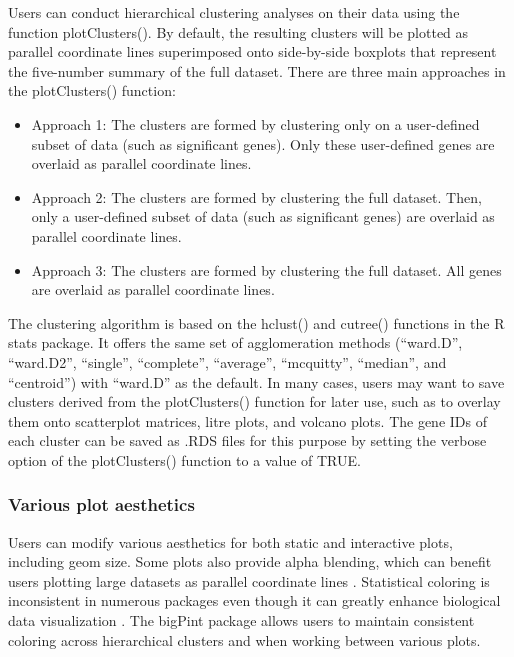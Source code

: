 \documentclass[parskip=full]{bmcart} %
\begin{document}
Users can conduct hierarchical clustering analyses on their data using the function plotClusters(). By default, the resulting clusters will be plotted as parallel coordinate lines superimposed onto side-by-side boxplots that represent the five-number summary of the full dataset. There are three main approaches in the plotClusters() function:

\begin{itemize}  
\item Approach 1: The clusters are formed by clustering only on a user-defined subset of data (such as significant genes). Only these user-defined genes are overlaid as parallel coordinate lines. 
\item Approach 2: The clusters are formed by clustering the full dataset. Then, only a user-defined subset of data (such as significant genes) are overlaid as parallel coordinate lines.
\item Approach 3: The clusters are formed by clustering the full dataset. All genes are overlaid as parallel coordinate lines.
\end{itemize}

The clustering algorithm is based on the hclust() and cutree() functions in the R stats package. It offers the same set of agglomeration methods (``ward.D'', ``ward.D2'', ``single'', ``complete'', ``average'', ``mcquitty'', ``median'', and ``centroid'') with ``ward.D'' as the default. In many cases, users may want to save clusters derived from the plotClusters() function for later use, such as to overlay them onto scatterplot matrices, litre plots, and volcano plots. The gene IDs of each cluster can be saved as .RDS files for this purpose by setting the verbose option of the plotClusters() function to a value of TRUE.

\subsubsection*{Various plot aesthetics}

Users can modify various aesthetics for both static and interactive plots, including geom size. Some plots also provide alpha blending, which can benefit users plotting large datasets as parallel coordinate lines \cite{unwin2007computational}. Statistical coloring is inconsistent in numerous packages even though it can greatly enhance biological data visualization \cite{yin2012ggbio}. The bigPint package allows users to maintain consistent coloring across hierarchical clusters and when working between various plots.
\end{document}
